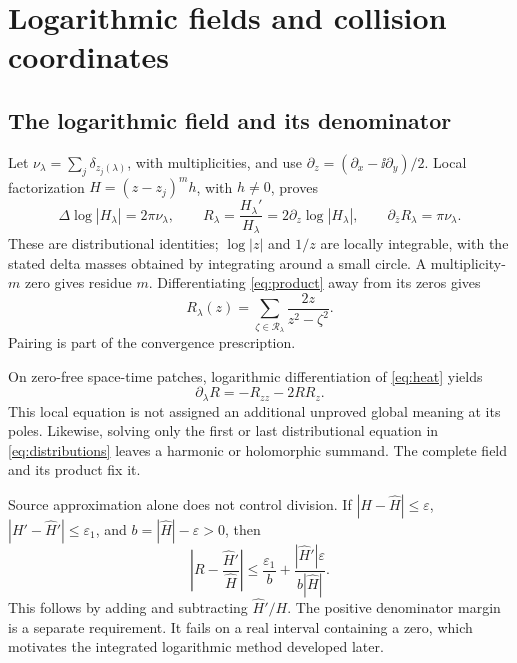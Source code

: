 \section{Logarithmic fields and collision coordinates}\label{sec:log-collision}

\subsection{The logarithmic field and its denominator}

Let \(\nu_\lambda=\sum_j\delta_{z_j(\lambda)}\), with multiplicities,
and use \(\partial_z=(\partial_x-\ii\partial_y)/2\).
Local factorization \(H=(z-z_j)^m h\), with \(h\ne0\), proves
\begin{equation}\label{eq:distributions}
 \Delta\log|H_\lambda|=2\pi\nu_\lambda,\qquad
 R_\lambda=\frac{H_\lambda'}{H_\lambda}
           =2\partial_z\log|H_\lambda|,\qquad
 \partial_{\bar z}R_\lambda=\pi\nu_\lambda .
\end{equation}
These are distributional identities; \(\log|z|\) and \(1/z\) are
locally integrable, with the stated delta masses obtained by integrating
around a small circle. A multiplicity-\(m\) zero gives residue \(m\).
Differentiating \eqref{eq:product} away from its zeros gives
\[
 R_\lambda(z)=\sum_{\zeta\in\mathcal R_\lambda}
                    \frac{2z}{z^2-\zeta^2}.
\]
Pairing is part of the convergence prescription.

On zero-free space-time patches, logarithmic differentiation of
\eqref{eq:heat} yields
\begin{equation}\label{eq:burgers}
 \partial_\lambda R=-R_{zz}-2RR_z.
\end{equation}
This local equation is not assigned an additional unproved global
meaning at its poles. Likewise, solving only the first or last
distributional equation in \eqref{eq:distributions} leaves a harmonic
or holomorphic summand. The complete field and its product fix it.

Source approximation alone does not control division. If
\(|H-\widehat H|\le\varepsilon\),
\(|H'-\widehat H'|\le\varepsilon_1\), and
\(b=|\widehat H|-\varepsilon>0\), then
\begin{equation}\label{eq:ratio-error}
 \left|R-\frac{\widehat H'}{\widehat H}\right|
 \le\frac{\varepsilon_1}{b}
       +\frac{|\widehat H'|\varepsilon}{b|\widehat H|}.
\end{equation}
This follows by adding and subtracting
\(\widehat H'/H\). The positive denominator margin is a separate
requirement. It fails on a real interval containing a zero, which
motivates the integrated logarithmic method developed later.


